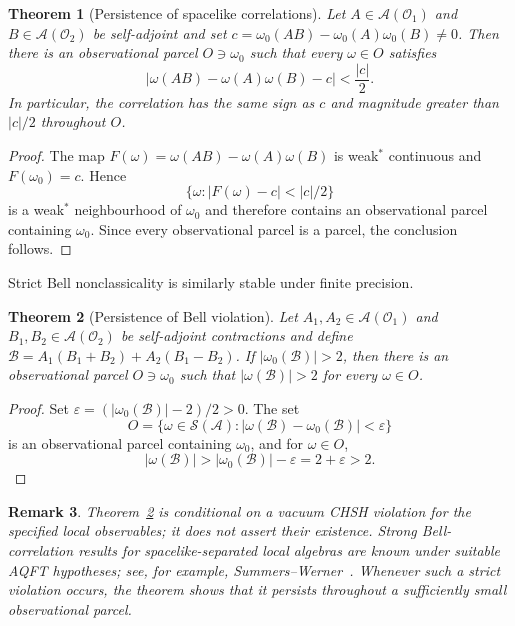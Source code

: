\documentclass[11pt]{article}
\newtheorem{theorem}{Theorem}[section]
\newtheorem{remark}[theorem]{Remark}
\newcommand{\A}{\mathcal{A}}
\begin{document}
\begin{theorem}[Persistence of spacelike correlations]
\label{thm:vacuumcorrelation}
Let $A\in\A(\mathcal O_1)$ and $B\in\A(\mathcal O_2)$ be self-adjoint and
set $c=\omega_0(AB)-\omega_0(A)\omega_0(B)\neq0$. Then there is an observational parcel
$O\ni\omega_0$ such that every $\omega\in O$ satisfies
\[
|\omega(AB)-\omega(A)\omega(B)-c|<\frac{|c|}{2}.
\]
In particular, the correlation has the same sign as $c$ and magnitude
greater than $|c|/2$ throughout $O$.
\end{theorem}

\begin{proof}
The map $F(\omega)=\omega(AB)-\omega(A)\omega(B)$ is weak$^*$ continuous
and $F(\omega_0)=c$. Hence
\[
\{\omega:|F(\omega)-c|<|c|/2\}
\]
is a weak$^*$ neighbourhood of $\omega_0$ and therefore contains an
observational parcel containing $\omega_0$. Since every observational
parcel is a parcel, the conclusion follows.
\end{proof}

Strict Bell nonclassicality is similarly stable under finite precision.

\begin{theorem}[Persistence of Bell violation]
\label{thm:bellviolation}
Let $A_1,A_2\in\A(\mathcal O_1)$ and
$B_1,B_2\in\A(\mathcal O_2)$ be self-adjoint contractions and define
$\mathcal B=A_1(B_1+B_2)+A_2(B_1-B_2)$. If
$|\omega_0(\mathcal B)|>2$, then there is an observational parcel $O\ni\omega_0$ such
that $|\omega(\mathcal B)|>2$ for every $\omega\in O$.
\end{theorem}

\begin{proof}
Set $\varepsilon=(|\omega_0(\mathcal B)|-2)/2>0$. The set
\[
O=
\{\omega\in\mathcal S(\A):
|\omega(\mathcal B)-\omega_0(\mathcal B)|<\varepsilon\}
\]
is an observational parcel containing $\omega_0$, and for
$\omega\in O$,
\[
|\omega(\mathcal B)|
>
|\omega_0(\mathcal B)|-\varepsilon
=
2+\varepsilon>2.
\]
\end{proof}

\begin{remark}
Theorem~\ref{thm:bellviolation} is conditional on a vacuum CHSH violation
for the specified local observables; it does not assert their existence.
Strong Bell-correlation results for spacelike-separated local algebras are
known under suitable AQFT hypotheses; see, for example,
Summers--Werner~\cite{SummersWerner}. Whenever such a strict violation occurs, the theorem shows that it
persists throughout a sufficiently small observational parcel.
\end{remark}
\end{document}

